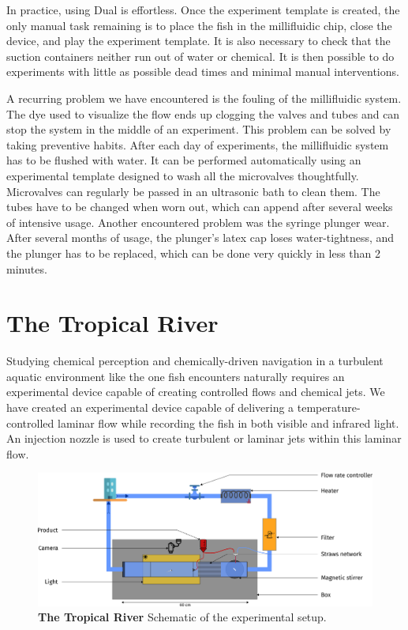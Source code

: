   In practice, using Dual is effortless. Once the experiment template is created, the only manual task remaining is to place the fish in the millifluidic chip, close the device, and play the experiment template. It is also necessary to check that the suction containers neither run out of water or chemical. It is then possible to do experiments with little as possible dead times and minimal manual interventions.

  A recurring problem we have encountered is the fouling of the millifluidic system. The dye used to visualize the flow ends up clogging the valves and tubes and can stop the system in the middle of an experiment. This problem can be solved by taking preventive habits. After each day of experiments, the millifluidic system has to be flushed with water. It can be performed automatically using an experimental template designed to wash all the microvalves thoughtfully. Microvalves can regularly be passed in an ultrasonic bath to clean them. The tubes have to be changed when worn out, which can append after several weeks of intensive usage. Another encountered problem was the syringe plunger wear. After several months of usage, the plunger's latex cap loses water-tightness, and the plunger has to be replaced, which can be done very quickly in less than 2 minutes.

  \section{The Tropical River}
  Studying chemical perception and chemically-driven navigation in a turbulent aquatic environment like the one fish encounters naturally requires an experimental device capable of creating controlled flows and chemical jets. We have created an experimental device capable of delivering a temperature-controlled laminar flow while recording the fish in both visible and infrared light. An injection nozzle is used to create turbulent or laminar jets within this laminar flow.

    \begin{figure}[h]
      \centering
      \includegraphics[width=1\textwidth]{part_2/assets/river.png}
      \caption{\textbf{The Tropical River} Schematic of the experimental setup.}
      \label{river}
    \end{figure}

